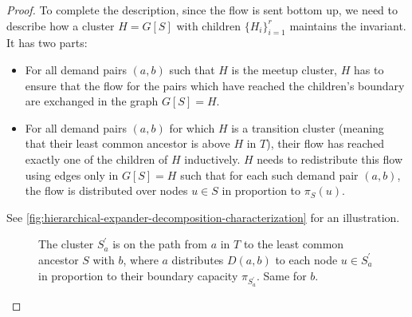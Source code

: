 \begin{proof}
	To complete the description, since the flow is sent bottom up, we need to describe how a cluster \(H= G[S]\) with children \(\{ H_i \} _{i=1}^{r}\) maintains the invariant. It has two parts:
	\begin{itemize}
		\item For all demand pairs \((a, b)\) such that \(H\) is the meetup cluster, \(H\) has to ensure that the flow for the pairs which have reached the children's boundary are exchanged in the graph \(G[S] = H\).
		\item For all demand pairs \((a, b)\) for which \(H\) is a transition cluster (meaning that their least common ancestor is above \(H\) in \(T\)), their flow has reached exactly one of the children of \(H\) inductively. \(H\) needs to redistribute this flow using edges only in \(G[S] = H\) such that for each such demand pair \((a, b)\), the flow is distributed over nodes \(u \in S\) in proportion to \(\pi _S(u)\).
	\end{itemize}
	See \autoref{fig:hierarchical-expander-decomposition-characterization} for an illustration.
	\begin{figure}[H]
		\centering
		\caption{The cluster \(S^{\prime} _a\) is on the path from \(a\) in \(T\) to the least common ancestor \(S\) with \(b\), where \(a\) distributes \(D(a, b)\) to each node \(u \in S^{\prime} _a\) in proportion to their boundary capacity \(\pi _{S^{\prime} _a}\). Same for \(b\).}
		\label{fig:hierarchical-expander-decomposition-characterization}
	\end{figure}


\end{proof}
